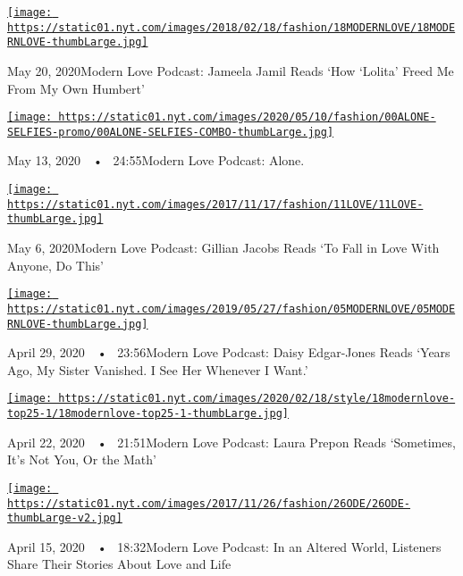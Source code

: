\href{https://www.nytimes.com/2020/05/20/style/modern-love-podcast-jameela-jamil.html?action=click\&module=audio-series-bar\&region=header\&pgtype=Article}{\texttt{[image: https://static01.nyt.com/images/2018/02/18/fashion/18MODERNLOVE/18MODERNLOVE-thumbLarge.jpg]}}

May 20, 2020Modern Love Podcast: Jameela Jamil Reads `How `Lolita' Freed
Me From My Own Humbert'

\href{https://www.nytimes.com/2020/05/13/style/modern-love-podcast-coronavirus-living-alone.html?action=click\&module=audio-series-bar\&region=header\&pgtype=Article}{\texttt{[image: https://static01.nyt.com/images/2020/05/10/fashion/00ALONE-SELFIES-promo/00ALONE-SELFIES-COMBO-thumbLarge.jpg]}}

May 13, 2020~~•~ 24:55Modern Love Podcast: Alone.

\href{https://www.nytimes.com/2020/05/06/style/modern-love-podcast-gillian-jacobs.html?action=click\&module=audio-series-bar\&region=header\&pgtype=Article}{\texttt{[image: https://static01.nyt.com/images/2017/11/17/fashion/11LOVE/11LOVE-thumbLarge.jpg]}}

May 6, 2020Modern Love Podcast: Gillian Jacobs Reads `To Fall in Love
With Anyone, Do This'

\href{https://www.nytimes.com/2020/04/29/style/modern-love-podcast-daisy-edgar-jones.html?action=click\&module=audio-series-bar\&region=header\&pgtype=Article}{\texttt{[image: https://static01.nyt.com/images/2019/05/27/fashion/05MODERNLOVE/05MODERNLOVE-thumbLarge.jpg]}}

April 29, 2020~~•~ 23:56Modern Love Podcast: Daisy Edgar-Jones Reads
`Years Ago, My Sister Vanished. I See Her Whenever I Want.'

\href{https://www.nytimes.com/2020/04/22/style/modern-love-podcast-laura-prepon.html?action=click\&module=audio-series-bar\&region=header\&pgtype=Article}{\texttt{[image: https://static01.nyt.com/images/2020/02/18/style/18modernlove-top25-1/18modernlove-top25-1-thumbLarge.jpg]}}

April 22, 2020~~•~ 21:51Modern Love Podcast: Laura Prepon Reads
`Sometimes, It's Not You, Or the Math'

\href{https://www.nytimes.com/2020/04/15/style/modern-love-podcast-coronavirus.html?action=click\&module=audio-series-bar\&region=header\&pgtype=Article}{\texttt{[image: https://static01.nyt.com/images/2017/11/26/fashion/26ODE/26ODE-thumbLarge-v2.jpg]}}

April 15, 2020~~•~ 18:32Modern Love Podcast: In an Altered World,
Listeners Share Their Stories About Love and Life

